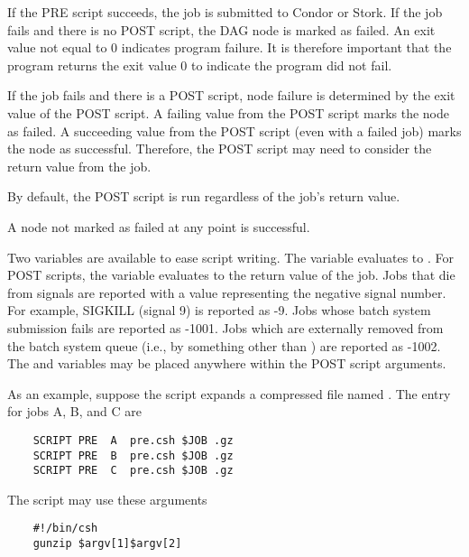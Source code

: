 If the PRE script succeeds, the job is submitted to Condor or Stork. 
If the job fails and there is no POST script,
the DAG node is marked as failed.
An exit value not equal to 0 indicates program failure.
It is therefore important that the program returns the exit
value 0 to indicate the program did not fail.

If the job fails and there is a POST script,
node failure is determined by the exit value of the POST script.
A failing value from the POST script marks the node as failed.
A succeeding value from the POST script (even with a failed
job) marks the node as successful.
Therefore, the POST script may need to consider the return
value from the job.

By default, the POST script is run regardless of the job's
return value.

A node not marked as failed at any point is successful.

Two variables are available to ease script writing.
The  variable evaluates to .
For POST scripts, the  variable evaluates to the return value of the job.
Jobs that die from signals are reported with a  value
representing the negative signal number.  For example, SIGKILL (signal
9) is reported as -9.
Jobs whose batch system submission fails are reported as -1001.
Jobs which are externally removed from the batch system queue (i.e.,
by something other than ) are reported as -1002.
The  and  variables may be
placed anywhere within the POST script arguments.

As an example, suppose the  script expands a compressed file named
.
The  entry for jobs A, B, and C are

\footnotesize
\begin{verbatim}
    SCRIPT PRE  A  pre.csh $JOB .gz
    SCRIPT PRE  B  pre.csh $JOB .gz
    SCRIPT PRE  C  pre.csh $JOB .gz
\end{verbatim}
\normalsize

The script  may use these arguments

\begin{verbatim}
    #!/bin/csh
    gunzip $argv[1]$argv[2]
\end{verbatim}



